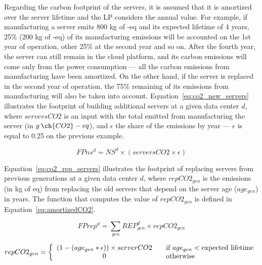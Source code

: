 Regarding the carbon footprint of the servers, it is assumed that it is amortized over the server lifetime and the LP considers the annual value. For example, if manufacturing a server emits 800 kg of -eq and its expected lifetime of 4 years, 25\% (200 kg of -eq) of its manufacturing emissions will be accounted on the 1st year of operation, other 25\% at the second year and so on. After the fourth year, the server can still remain in the cloud platform, and its carbon emissions will come only from the power consumption --- all the carbon emissions from manufacturing have been amortized. On the other hand, if the server is replaced in the second year of operation, the 75\% remaining of its emissions from manufacturing will also be taken into account. Equation~\eqref{eq:co2_new_servers} illustrates the footprint of building additional servers at a given data center $d$, where $serversCO2$ is an input with the total  emitted from manufacturing the server (in $g\,\ch{CO2}-eq$), and $\epsilon$ the share of the emissions by year ---  $\epsilon$ is equal to 0.25 on the previous example.

\begin{equation} \label{eq:co2_new_servers}
FPns^d = NS^d \times (serversCO2 \times \epsilon)	
\end{equation}

Equation~\eqref{eq:co2_rep_servers} illustrates the footprint of replacing servers from previous generations at a given data center $d$, where $repCO2_{gen}$ is the emissions (in kg of  eq) from replacing the old servers that depend on the server age ($age_{gen}$) in years. The function that computes the value of  $repCO2_{gen}$  is defined in Equation~\eqref{eq:amortizedCO2}. 

\begin{equation} \label{eq:co2_rep_servers}
FPrep^d = \sum_{gen} REP_{gen}^d  \times repCO2_{gen}
\end{equation}


\begin{equation} \label{eq:amortizedCO2}
repCO2_{gen} =  \left\{ 
  \begin{array}{ c l }
    (1 - (age_{gen} * \epsilon)) \times serverCO2   & \quad \textrm{if $age_{gen}$}  <  \textrm{expected lifetime}      \\
    0     & \quad  \textrm{otherwise}   \\
  \end{array}
\right.
\end{equation}


